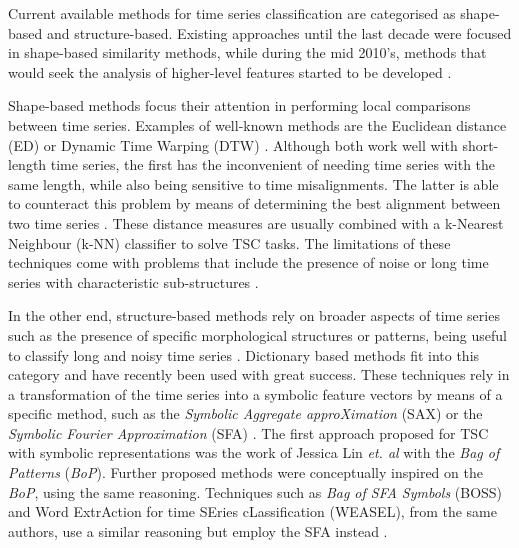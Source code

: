 Current available methods for time series classification are categorised as shape-based and structure-based. Existing approaches until the last decade were focused in shape-based similarity methods, while during the mid 2010's, methods that would seek the analysis of higher-level features started to be developed \cite{Keogh2004}.
\par
Shape-based methods focus their attention in performing local comparisons between time series. Examples of well-known methods are the Euclidean distance (ED) or Dynamic Time Warping (DTW) \cite{jlin2013}. Although both work well with short-length time series, the first has the inconvenient of needing time series with the same length, while also being sensitive to time misalignments. The latter is able to counteract this problem by means of determining the best alignment between two time series \cite{Keogh2004, jlin2013}. These distance measures are usually combined with a k-Nearest Neighbour (k-NN) classifier to solve TSC tasks. The limitations of these techniques come with problems that include the presence of noise or long time series with characteristic sub-structures \cite{BOSS}.
\par
In the other end, structure-based methods rely on broader aspects of time series such as the presence of specific morphological structures or patterns, being useful to classify long and noisy time series \cite{BOSS}. Dictionary based methods fit into this category and have recently been used with great success. These techniques rely in a transformation of the time series into a symbolic feature vectors by means of a specific method, such as the \textit{Symbolic Aggregate approXimation} (SAX) \cite{SAX} or the \textit{Symbolic Fourier Approximation} (SFA) \cite{SFA}. The first approach proposed for TSC with symbolic representations was the work of Jessica Lin \textit{et. al} with the \textit{Bag of Patterns} (\textit{BoP})\cite{jlin2013}. Further proposed methods were conceptually inspired on the \textit{BoP}, using the same reasoning. Techniques such as \textit{Bag of SFA Symbols} (BOSS) and Word ExtrAction for time SEries cLassification (WEASEL), from the same authors, use a similar reasoning but employ the SFA instead \cite{BOSS, weasle}.
\par
